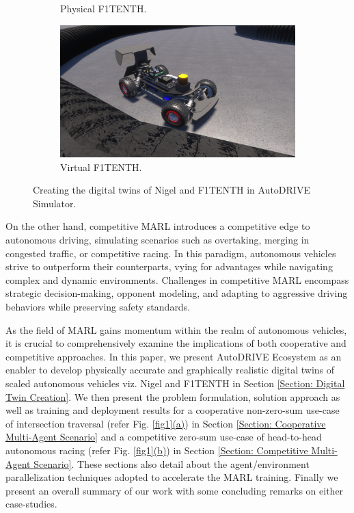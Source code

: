 \documentclass[letterpaper, 10 pt, conference]{ieeeconf}  %
\begin{document}
\begin{figure}[t]
\begin{subfigure}[b]{0.245\linewidth}
			\caption{Physical F1TENTH.}
			\label{fig2c}
		\end{subfigure}
		\hfill
		\begin{subfigure}[b]{0.245\linewidth}
			\centering
			\includegraphics[width=\linewidth]{Fig2d.png}
			\caption{Virtual F1TENTH.}
			\label{fig2d}
		\end{subfigure}
		\caption{Creating the digital twins of Nigel and F1TENTH in AutoDRIVE Simulator.}
		\label{fig2}
	\end{figure}
	
	On the other hand, competitive MARL \cite{fuchs2020, song2021, AutoRACE-2021, 9790832} introduces a competitive edge to autonomous driving, simulating scenarios such as overtaking, merging in congested traffic, or competitive racing. In this paradigm, autonomous vehicles strive to outperform their counterparts, vying for advantages while navigating complex and dynamic environments. Challenges in competitive MARL encompass strategic decision-making, opponent modeling, and adapting to aggressive driving behaviors while preserving safety standards.
	
	As the field of MARL gains momentum within the realm of autonomous vehicles, it is crucial to comprehensively examine the implications of both cooperative and competitive approaches. In this paper, we present AutoDRIVE Ecosystem \cite{AutoDRIVE2023, AutoDRIVEReport2022} as an enabler to develop physically accurate and graphically realistic digital twins of scaled autonomous vehicles viz. Nigel \cite{10196233} and F1TENTH \cite{F1TENTH2019} in Section \ref{Section: Digital Twin Creation}. We then present the problem formulation, solution approach as well as training and deployment results for a cooperative non-zero-sum use-case of intersection traversal (refer Fig. \hyperref[fig1]{\ref*{fig1}(a)}) in Section \ref{Section: Cooperative Multi-Agent Scenario} and a competitive zero-sum use-case of head-to-head autonomous racing (refer Fig. \hyperref[fig1]{\ref*{fig1}(b)}) in Section \ref{Section: Competitive Multi-Agent Scenario}. These sections also detail about the agent/environment parallelization techniques adopted to accelerate the MARL training. Finally we present an overall summary of our work with some concluding remarks on either case-studies.
	
\end{document}

